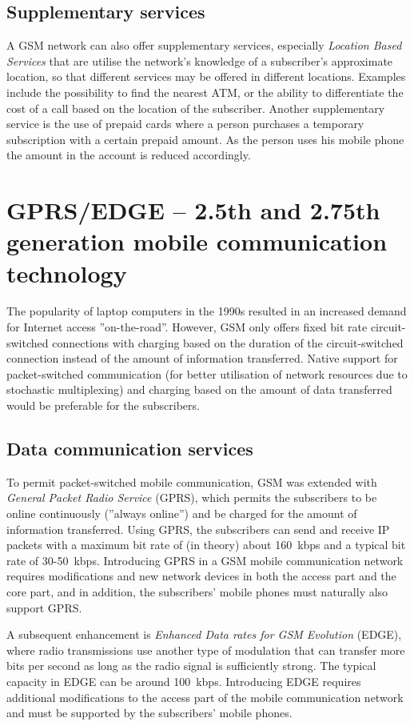 \subsection{Supplementary services}
A GSM network can also offer supplementary services, especially \emph{Location Based Services} that are utilise the network's knowledge of a subscriber's approximate location, so that different services may be offered in different locations. Examples include the possibility to find the nearest ATM, or the ability to differentiate the cost of a call based on the location of the subscriber. Another supplementary service is the use of prepaid cards where a person purchases a temporary subscription with a certain prepaid amount. As the person uses his mobile phone the amount in the account is reduced accordingly.

\section{GPRS/EDGE -- 2.5th and 2.75th generation mobile communication technology}
The popularity of laptop computers in the 1990s resulted in an increased demand for Internet access ''on-the-road''. However, GSM only offers fixed bit rate circuit-switched connections with charging based on the duration of the circuit-switched connection instead of the amount of information transferred. Native support for packet-switched communication (for better utilisation of network resources due to stochastic multiplexing) and charging based on the amount of data transferred would be preferable for the subscribers.

\subsection{Data communication services}
To permit packet-switched mobile communication, GSM was extended with \emph{General Packet Radio Service} (GPRS), which permits the subscribers to be online continuously (''always online'') and be charged for the amount of information transferred. Using GPRS, the subscribers can send and receive IP packets with a maximum bit rate of (in theory) about 160~kbps and a typical bit rate of 30-50~kbps. Introducing GPRS in a GSM mobile communication network requires modifications and new network devices in both the access part and the core part, and in addition, the subscribers' mobile phones must naturally also support GPRS.

A subsequent enhancement is \emph{Enhanced Data rates for GSM Evolution} (EDGE), where radio transmissions use another type of modulation that can transfer more bits per second as long as the radio signal is sufficiently strong. The typical capacity in EDGE can be around 100~kbps. Introducing EDGE requires additional modifications to the access part of the mobile communication network and must be supported by the subscribers' mobile phones.

